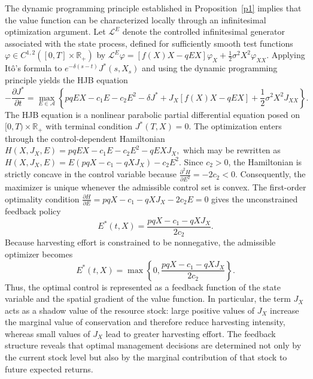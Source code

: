 \documentclass[11pt]{article}
\begin{document}
	The dynamic programming principle established in Proposition~\ref{p1} implies that the value function can be characterized locally through an infinitesimal optimization argument. Let $\mathcal{L}^{E}$ denote the controlled infinitesimal generator associated with the state process, defined for sufficiently smooth test functions $\varphi\in C^{1,2}([0,T]\times\mathbb{R}_+)$ by
	$
	\mathcal{L}^{E}\varphi
	=
	\left[f(X)X-qEX\right]\varphi_X
	+
	\frac{1}{2}\sigma^2X^2\varphi_{XX}.
	$
	Applying It\^o's formula to $e^{-\delta(s-t)}J^*(s,X_s)$ and using the dynamic programming principle yields the HJB equation
	\begin{equation}
		-\frac{\partial J^*}{\partial t}
		=
		\max_{E\in\mathcal{A}}
		\left\{
		pqEX-c_1E-c_2E^2
		-\delta J^*
		+
		J_X\left[f(X)X-qEX\right]
		+
		\frac{1}{2}\sigma^2X^2J_{XX}
		\right\}.
		\label{eq:hjb}
	\end{equation}
	The HJB equation is a nonlinear parabolic partial differential equation posed on $[0,T)\times\mathbb{R}_+$ with terminal condition $J^*(T,X)=0$. The optimization enters through the control-dependent Hamiltonian
	$
	H(X,J_X,E)
	=
	pqEX-c_1E-c_2E^2-qEXJ_X,
	$
	which may be rewritten as
	$
	H(X,J_X,E)
	=
	E(pqX-c_1-qXJ_X)-c_2E^2.
	$
	Since $c_2>0$, the Hamiltonian is strictly concave in the control variable because
	$
	\frac{\partial^2 H}{\partial E^2}
	=
	-2c_2
	<
	0.
	$
	Consequently, the maximizer is unique whenever the admissible control set is convex. The first-order optimality condition
	$
	\frac{\partial H}{\partial E}
	=
	pqX-c_1-qXJ_X-2c_2E
	=
	0
	$
	gives the unconstrained feedback policy
	\begin{equation}
		E^*(t,X)
		=
		\frac{pqX-c_1-qXJ_X}{2c_2}.
		\label{eq:hjb_effort}
	\end{equation}
	Because harvesting effort is constrained to be nonnegative, the admissible optimizer becomes
	\begin{equation}
		E^*(t,X)
		=
		\max
		\left\{
		0,
		\frac{pqX-c_1-qXJ_X}{2c_2}
		\right\}.
		\label{eq:nonnegative_effort}
	\end{equation}
	Thus, the optimal control is represented as a feedback function of the state variable and the spatial gradient of the value function. In particular, the term $J_X$ acts as a shadow value of the resource stock: large positive values of $J_X$ increase the marginal value of conservation and therefore reduce harvesting intensity, whereas small values of $J_X$ lead to greater harvesting effort. The feedback structure reveals that optimal management decisions are determined not only by the current stock level but also by the marginal contribution of that stock to future expected returns.
	
\end{document}
